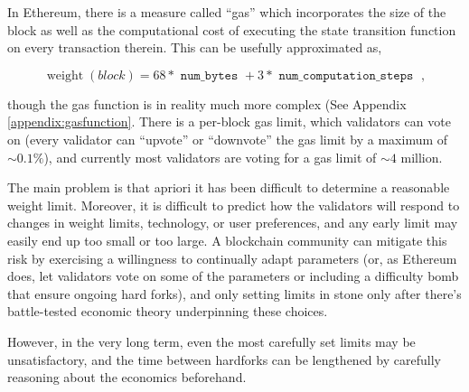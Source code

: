 \documentclass[12pt, final]{article}
\newcommand{\tt}[1]{{\texttt{ #1 }}}
\newcommand{\fname}[1]{ \operatorname{ #1 } }
\begin{document}


In Ethereum, there is a measure called ``gas'' which incorporates the size of the block as well as the computational cost of executing the state transition function on every transaction therein.  This can be usefully approximated as,

\begin{equation}
\fname{weight}(block) = 68* \tt{num\_bytes} + 3* \tt{num\_computation\_steps} \; , 
\end{equation}

though the gas function is in reality much more complex (See Appendix \ref{appendix:gasfunction}. There is a per-block gas limit, which validators can vote on (every validator can ``upvote'' or ``downvote'' the gas limit by a maximum of $\sim\!0.1\%$), and currently most validators are voting for a gas limit of $\sim \! 4$ million. 

The main problem is that apriori it has been difficult to determine a reasonable weight limit.  Moreover, it is difficult to predict how the validators will respond to changes in weight limits, technology, or user preferences, and any early limit may easily end up too small or too large. A blockchain community can mitigate this risk by exercising a willingness to continually adapt parameters (or, as Ethereum does, let validators vote on some of the parameters or including a difficulty bomb\cite{wood2014ethereum} that ensure ongoing hard forks), and only setting limits in stone only after there's battle-tested economic theory underpinning these choices.

However, in the very long term, even the most carefully set limits may be unsatisfactory, and the time between hardforks can be lengthened by carefully reasoning about the economics beforehand.
\end{document}
